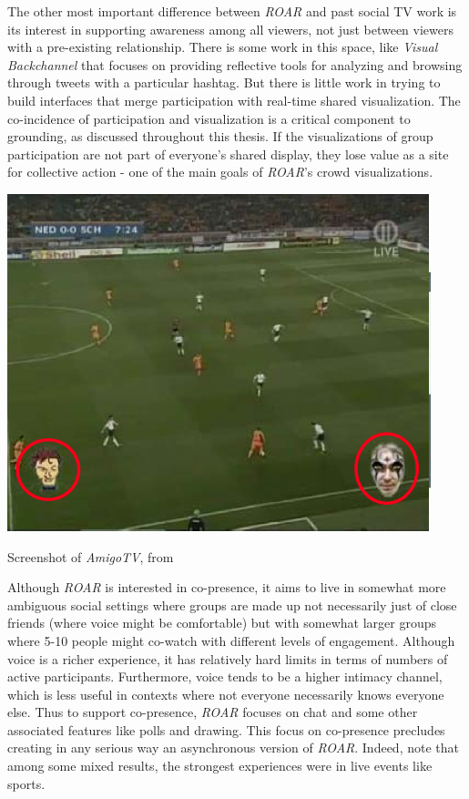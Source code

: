 The other most important difference between \emph{ROAR} and past social TV work is its interest in supporting awareness among all viewers, not just between viewers with a pre-existing relationship. There is some work in this space, like \emph{Visual Backchannel}\citep{Dork:2010fb} that focuses on providing reflective tools for analyzing and browsing through tweets with a particular hashtag. But there is little work in trying to build interfaces that merge participation with real-time shared visualization. The co-incidence of participation and visualization is a critical component to grounding, as discussed throughout this thesis. If the visualizations of group participation are not part of everyone's shared display, they lose value as a site for collective action - one of the main goals of \emph{ROAR}'s crowd visualizations.

\begin{marginfigure}
	\includegraphics{figures/roar/amigotv.png}
	\caption{Screenshot of \emph{AmigoTV}, from \citep{coppens2004amigotv}}
	\label{fig:amigotv}
\end{marginfigure}

Although \emph{ROAR} is interested in co-presence, it aims to live in somewhat more ambiguous social settings where groups are made up not necessarily just of close friends (where voice might be comfortable) but with somewhat larger groups where 5-10 people might co-watch with different levels of engagement. Although voice is a richer experience, it has relatively hard limits in terms of numbers of active participants. Furthermore, voice tends to be a higher intimacy channel, which is less useful in contexts where not everyone necessarily knows everyone else. Thus to support co-presence, \emph{ROAR} focuses on chat and some other associated features like polls and drawing. This focus on co-presence precludes creating in any serious way an asynchronous version of \emph{ROAR}. Indeed, \citet{uses.socialTV} note that among some mixed results, the strongest experiences were in live events like sports. 





